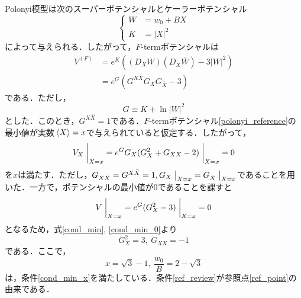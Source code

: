 \documentclass[a4paper,uplatex,dvipdfmx]{jsarticle}
\theoremstyle{definition}
\begin{document}
Polonyi模型は次のスーパーポテンシャルとケーラーポテンシャル
\begin{equation}
   \left\{
      \begin{alignedat}{1}
         W
         &=
         w_{0}
         +
         B X
         \\
         K
         &=
         |X|^2
      \end{alignedat}
   \right.
   \nonumber
\end{equation}
によって与えられる．したがって，$F$-termポテンシャルは
\begin{align}
   V^{(F)}
   &=
   e^{K}
   \left(
      (D_{X}W)
      (D_{\bar{X}}\bar{W})
      -
      3|W|^2
   \right)
   \nonumber
   \\
   &=
   e^{G}
   \left(  
      G^{X\bar{X}}
      G_{X}G_{\bar{X}}
      -
      3
   \right)
   \label{Plonyi_F-term_potential}
\end{align}
である．ただし，
\begin{equation}
   G
   \equiv
   K+\ln |W|^2
   \nonumber
\end{equation}
とした．このとき，$G^{X\bar{X}}=1$である．$F$-termポテンシャル\eqref{polonyi_reference}の最小値が実数$\ev*{X}=x$で与えられていると仮定する．したがって，
\begin{align}
   V_{X}\left.\vphantom{\frac{1}{2}}\right|_{X=x}
   =
   e^{G}
   G_{X}( G_{X}^{2}+G_{XX}-2 )
   \left.\vphantom{\frac{1}{2}}\right|_{X=x}
   =
   0
   \label{cond_min}
\end{align}
を$x$は満たす．ただし，$G_{X\bar{X}}=G^{X\bar{X}}=1, G_{X}
\left.\vphantom{\frac{1}{2}}\right|_{X=x}=G_{\bar{X}}
\left.\vphantom{\frac{1}{2}}\right|_{X=x}$であることを用いた．一方で，ポテンシャルの最小値が0であることを課すと
\begin{equation}
   V\left.\vphantom{\frac{1}{2}}\right|_{X=x}
   =
   e^{G}
   (
      G_{X}^{2}-3
   )\left.\vphantom{\frac{1}{2}}\right|_{X=x}
   =
   0
   \label{cond_min_0}
\end{equation}
となるため，式\eqref{cond_min}, \eqref{cond_min_0}より
\begin{equation}
   G_{X}^2
   =
   3
   ,\ 
   G_{XX}
   =
   -1
   \label{cond_min_x}
\end{equation}
である．ここで，
\begin{equation}
   x=\sqrt{3}-1
   ,\ 
   \frac{w_{0}}{B}
   =
   2-\sqrt{3}
   \label{ref_review}
\end{equation}
は，条件\eqref{cond_min_x}を満たしている．条件\eqref{ref_review}が参照点\eqref{ref_point}の由来である．
\end{document}
